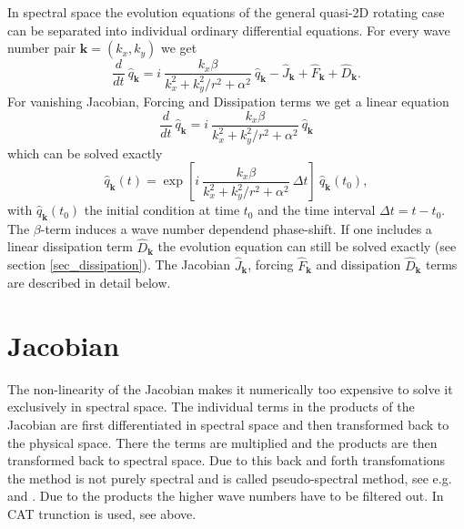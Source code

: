 In spectral space the evolution equations of the general quasi-2D 
rotating case can be separated into individual ordinary differential 
equations. For every wave number pair $\mathbf{k} = (k_{x},k_{y})$ we get
\begin{equation}  \label{eq_evolqhat}
  \frac{d}{dt} \ \hat{q}_{\mathbf{k}}
   =
   i \ \frac{k_{x} \beta}{k_{x}^{2} + k_{y}^{2}/r^{2} + \alpha^{2}} 
     \ \hat{q}_{\mathbf{k}}
   -   \hat{J}_{\mathbf{k}}
   +   \hat{F}_{\mathbf{k}}
   +   \hat{D}_{\mathbf{k}}.
\end{equation}
For vanishing Jacobian, Forcing and Dissipation terms we get a linear 
equation
\begin{equation}  \label{eq_evolqhat_lin}
  \frac{d}{dt} \ \hat{q}_{\mathbf{k}}
   =
   i \ \frac{k_{x} \beta}{k_{x}^{2} + k_{y}^{2}/r^{2} + \alpha^{2}} 
     \ \hat{q}_{\mathbf{k}}
\end{equation}
which can be solved exactly 
\begin{equation} \label{eq_qhatbetasol}
 \hat{q}_{\mathbf{k}}(t)
  = 
 \exp
  \left[
   i \ \frac{k_{x} \beta}{k_{x}^{2} + k_{y}^{2}/r^{2} + \alpha^{2}} \
   \Delta t 
  \right] 
 \ \hat{q}_{\mathbf{k}}(t_{0}),
\end{equation}
with $\hat{q}_{\mathbf{k}}(t_{0})$ the initial condition at time $t_{0}$
and the time interval $\Delta t = t - t_{0}$. The $\beta$-term induces
a wave number dependend phase-shift. If one includes a linear
dissipation term $\hat{D}_{\mathbf{k}}$ the evolution equation can still 
be solved exactly (see section \ref{sec_dissipation}). The Jacobian 
$\hat{J}_{\mathbf{k}}$, forcing $\hat{F}_{\mathbf{k}}$ and dissipation 
$\hat{D}_{\mathbf{k}}$ terms are described in detail below.
%
\section{Jacobian} 
\label{sec_jacobian} 
%
The non-linearity of the Jacobian makes it numerically too expensive 
to solve it exclusively in spectral space. The individual terms in 
the products of the Jacobian are first differentiated in spectral
space and then transformed back to the physical space. There the terms 
are multiplied and the products are then transformed back to spectral 
space. Due to this back and forth transfomations the method is not  
purely spectral and is called pseudo-spectral method, see e.g.\ 
\cite{kreissandoliger1972} and \cite{orszag1972}. Due to the products 
the higher wave numbers have to be filtered out. In CAT trunction is 
used, see above. 

